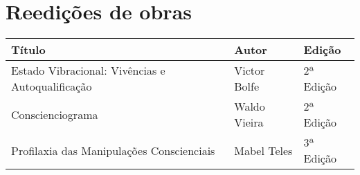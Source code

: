 \documentclass{gescons}
\begin{document}
\section*{Reedições de obras}

\begin{longtable}[]{@{}
  >{\raggedright\arraybackslash}p{}
  >{\raggedright\arraybackslash}p{}
  >{\raggedright\arraybackslash}p{}@{}}
\toprule\noalign{}
\begin{minipage}[b]{\linewidth}\centering
\textbf{Título}
\end{minipage} & \begin{minipage}[b]{\linewidth}\centering
\textbf{Autor}
\end{minipage} & \begin{minipage}[b]{\linewidth}\centering
\textbf{Edição}
\end{minipage} \\
\hline
\begin{minipage}[b]{\linewidth}\raggedright
Estado Vibracional: Vivências e Autoqualificação
\end{minipage} & \begin{minipage}[b]{\linewidth}\raggedright
Victor Bolfe
\end{minipage} & \begin{minipage}[b]{\linewidth}\raggedright
2ª Edição
\end{minipage} \\
\hline
\begin{minipage}[b]{\linewidth}\raggedright
Conscienciograma
\end{minipage} & \begin{minipage}[b]{\linewidth}\raggedright
Waldo Vieira
\end{minipage} & \begin{minipage}[b]{\linewidth}\raggedright
2ª Edição
\end{minipage} \\
\hline
\begin{minipage}[b]{\linewidth}\raggedright
Profilaxia das Manipulações Conscienciais
\end{minipage} & \begin{minipage}[b]{\linewidth}\raggedright
Mabel Teles
\end{minipage} & \begin{minipage}[b]{\linewidth}\raggedright
3ª Edição
\end{minipage} \\

\end{longtable}
\end{document}
